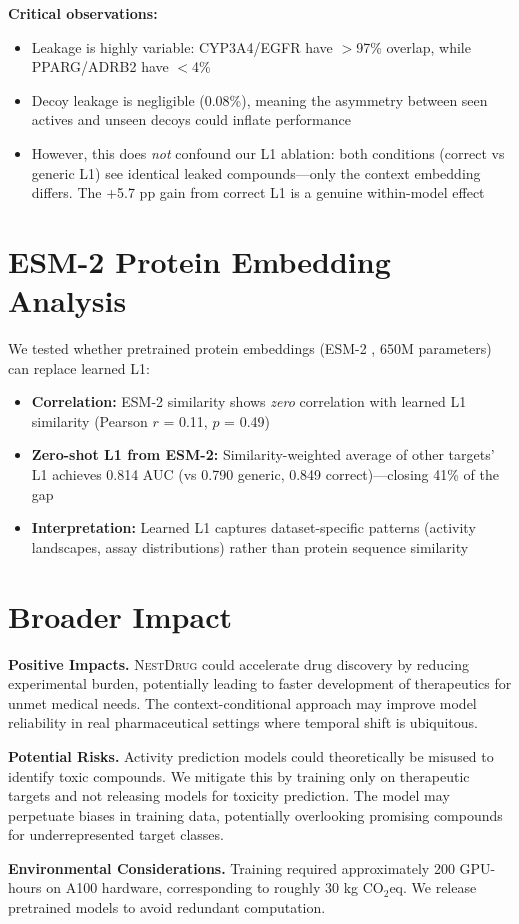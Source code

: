 \documentclass[runningheads]{llncs}
\newcommand{\methodname}{\textsc{NestDrug}}
\begin{document}
\textbf{Critical observations:}
\begin{itemize}[noitemsep,topsep=0pt]
\item Leakage is highly variable: CYP3A4/EGFR have $>$97\% overlap, while PPARG/ADRB2 have $<$4\%
\item Decoy leakage is negligible (0.08\%), meaning the asymmetry between seen actives and unseen decoys could inflate performance
\item However, this does \textit{not} confound our L1 ablation: both conditions (correct vs generic L1) see identical leaked compounds---only the context embedding differs. The +5.7 pp gain from correct L1 is a genuine within-model effect
\end{itemize}

\section{ESM-2 Protein Embedding Analysis}
\label{app:esm2}

We tested whether pretrained protein embeddings (ESM-2 \cite{lin_2023_esm2}, 650M parameters) can replace learned L1:

\begin{itemize}[noitemsep,topsep=0pt]
\item \textbf{Correlation:} ESM-2 similarity shows \textit{zero} correlation with learned L1 similarity (Pearson $r$ = 0.11, $p$ = 0.49)
\item \textbf{Zero-shot L1 from ESM-2:} Similarity-weighted average of other targets' L1 achieves 0.814 AUC (vs 0.790 generic, 0.849 correct)---closing 41\% of the gap
\item \textbf{Interpretation:} Learned L1 captures dataset-specific patterns (activity landscapes, assay distributions) rather than protein sequence similarity
\end{itemize}

\section{Broader Impact}
\label{app:impact}

\textbf{Positive Impacts.} \methodname{} could accelerate drug discovery by reducing experimental burden, potentially leading to faster development of therapeutics for unmet medical needs. The context-conditional approach may improve model reliability in real pharmaceutical settings where temporal shift is ubiquitous.

\textbf{Potential Risks.} Activity prediction models could theoretically be misused to identify toxic compounds. We mitigate this by training only on therapeutic targets and not releasing models for toxicity prediction. The model may perpetuate biases in training data, potentially overlooking promising compounds for underrepresented target classes.

\textbf{Environmental Considerations.} Training required approximately 200 GPU-hours on A100 hardware, corresponding to roughly 30 kg CO$_2$eq. We release pretrained models to avoid redundant computation.
\end{document}
